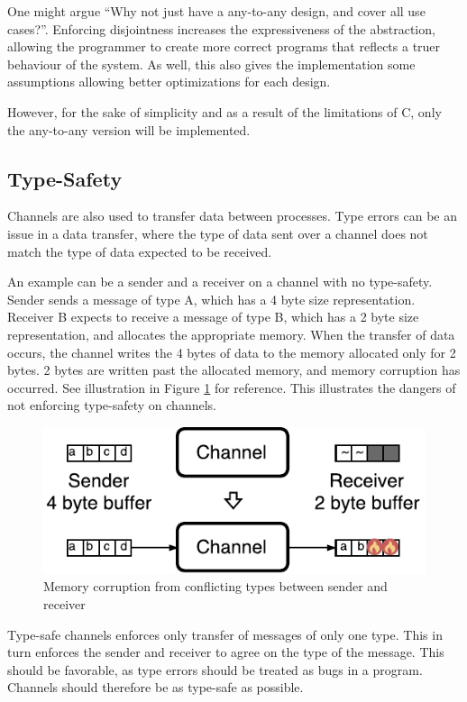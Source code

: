 One might argue ``Why not just have a any\hyp{}to\hyp{}any design, and cover all use cases?''. Enforcing disjointness increases the expressiveness of the abstraction, allowing the programmer to create more correct programs that reflects a truer behaviour of the system. As well, this also gives the implementation some assumptions allowing better optimizations for each design. 

However, for the sake of simplicity and as a result of the limitations of C, only the any\hyp{}to\hyp{}any version will be implemented. 


\subsection{Type\hyp{}Safety}

Channels are also used to transfer data between processes. Type errors can be an issue in a data transfer, where the type of data sent over a channel does not match the type of data expected to be received. 

An example can be a sender and a receiver on a channel with no type\hyp{}safety. Sender sends a message of type A, which has a 4 byte size representation. Receiver B expects to receive a message of type B, which has a 2 byte size representation, and allocates the appropriate memory. When the transfer of data occurs, the channel writes the 4 bytes of data to the memory allocated only for 2 bytes. 2 bytes are written past the allocated memory, and memory corruption has occurred. See illustration in Figure \ref{fig:type_error} for reference. This illustrates the dangers of not enforcing type\hyp{}safety on channels. 

\FloatBarrier

\begin{figure}[h]
    \centering
    \includegraphics[width=0.6\linewidth]{fig/type_error}
    \caption{Memory corruption from conflicting types between sender and receiver}
    \label{fig:type_error}
\end{figure}

\FloatBarrier

Type\hyp{}safe channels enforces only transfer of messages of only one type. This in turn enforces the sender and receiver to agree on the type of the message. This should be favorable, as type errors should be treated as bugs in a program. Channels should therefore be as type\hyp{}safe as possible.

